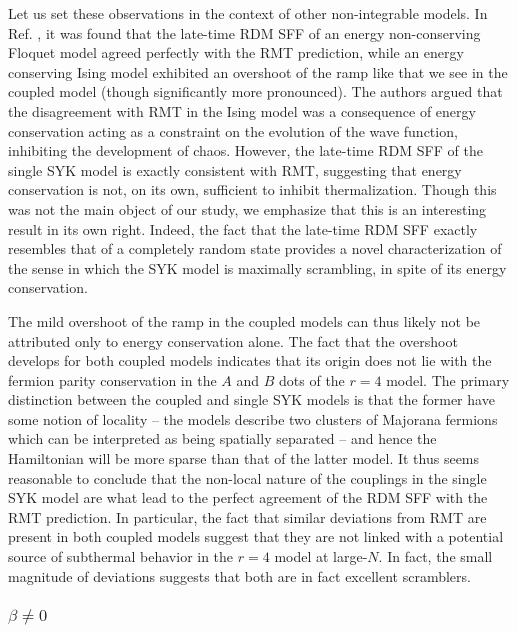 \documentclass[reprint, floatfix,eqsecnum,superscriptaddress,preprint,nofootinbib,onecolumn,amsmath,amssymb,aps,prb]{revtex4-2}
\begin{document}
Let us set these observations in the context of other non-integrable models. In Ref. \cite{Chen2018}, it was found that the late-time RDM SFF of an energy non-conserving Floquet model agreed perfectly with the RMT prediction, while an energy conserving Ising model exhibited an overshoot of the ramp like that we see in the coupled model (though significantly more pronounced). The authors argued that the disagreement with RMT in the Ising model was a consequence of energy conservation acting as a constraint on the evolution of the wave function, inhibiting the development of chaos. However, the late-time RDM SFF of the single SYK model is exactly consistent with RMT, suggesting that energy conservation is not, on its own, sufficient to inhibit thermalization. Though this was not the main object of our study, we emphasize that this is an interesting result in its own right.
Indeed, the fact that the late-time RDM SFF exactly resembles that of a completely random state provides a novel characterization of the sense in which the SYK model is maximally scrambling, in spite of its energy conservation. 

The mild overshoot of the ramp in the coupled models can thus likely not be attributed only to energy conservation alone. The fact that the overshoot develops for both coupled models indicates that its origin does not lie with the fermion parity conservation in the $A$ and $B$ dots of the $r=4$ model.
The primary distinction between the coupled and single SYK models is that the former have some notion of locality -- the models describe two clusters of Majorana fermions which can be interpreted as being spatially separated -- and hence the Hamiltonian will be more sparse than that of the latter model. It thus seems reasonable to conclude that the non-local nature of the couplings in the single SYK model are what lead to the perfect agreement of the RDM SFF with the RMT prediction. In particular, the fact that similar deviations from RMT are present in both coupled models suggest that they are not linked with a potential source of subthermal behavior in the $r=4$ model at large-$N$. In fact, the small magnitude of deviations suggests that both are in fact excellent scramblers. 

\subsubsection{\texorpdfstring{$\beta \neq 0$}{beta neq 0}}
\end{document}
